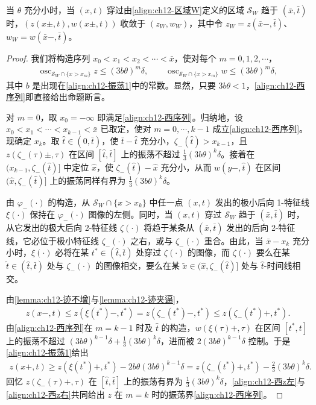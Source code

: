 \documentclass[../../main.tex]{subfiles}
\begin{document}
\begin{lemma}\label{lemma:ch12-西区域}
当 $\theta$ 充分小时，当 $(x,t)$ 穿过由\eqref{align:ch12-区域W}定义的区域 $\mathscr{S}_W$ 趋于 $(\bar x,\bar t)$ 时，$(z(x\pm,t),w(x\pm,t))$ 收敛于 $(z_W,w_W)$，其中令 $z_W=z(\bar x-,\bar t)$、$w_W=w(\bar x-,\bar t)$。
\end{lemma}

\begin{proof}
我们将构造序列 $x_0<x_1<x_2<\cdots<\bar x$，使对每个 $m=0,1,2,\cdots$，
\begin{align}
\operatorname{osc}_{\mathscr{S}_W\cap\{x>x_m\}}z\leqslant(3b\theta)^m\delta,\qquad
\operatorname{osc}_{\mathscr{S}_W\cap\{x>x_m\}}w\leqslant(3b\theta)^m\delta,
\label{align:ch12-西序列}
\end{align}
其中 $b$ 是出现在\eqref{align:ch12-振荡1}中的常数。显然，只要 $3b\theta<1$，\eqref{align:ch12-西序列}即直接给出命题断言。

对 $m=0$，取 $x_0=-\infty$ 即满足\eqref{align:ch12-西序列}。归纳地，设 $x_0<x_1<\cdots<x_{k-1}<\bar x$ 已取定，使对 $m=0,\cdots,k-1$ 成立\eqref{align:ch12-西序列}。现确定 $x_k$。取 $\hat t\in(0,\bar t)$，使 $\bar t-\hat t$ 充分小，$\zeta_-(\hat t)>x_{k-1}$，且 $z(\zeta_-(\tau)\pm,\tau)$ 在区间 $[\hat t,\bar t]$ 上的振荡不超过 $\frac13(3b\theta)^k\delta$。接着在 $(x_{k-1},\zeta_-(\hat t)]$ 中定位 $\hat x$，使 $\zeta_-(\hat t)-\hat x$ 充分小，从而 $w(y-,\hat t)$ 在区间 $(\hat x,\zeta_-(\hat t)]$ 上的振荡同样有界为 $\frac13(3b\theta)^k\delta$。

由 $\varphi_-(\cdot)$ 的构造，从 $\mathscr{S}_W\cap\{x>x_k\}$ 中任一点 $(x,t)$ 发出的极小后向 1-特征线 $\xi(\cdot)$ 保持在 $\varphi_-(\cdot)$ 图像的左侧。同时，当 $(x,t)$ 穿过 $\mathscr{S}_W$ 趋于 $(\bar x,\bar t)$ 时，从它发出的极大后向 2-特征线 $\zeta(\cdot)$ 将趋于某条从 $(\bar x,\bar t)$ 发出的后向 2-特征线，它必位于极小特征线 $\zeta_-(\cdot)$ 之右，或与 $\zeta_-(\cdot)$ 重合。由此，当 $\bar x-x_k$ 充分小时，$\xi(\cdot)$ 必将在某 $t^*\in(\hat t,\bar t)$ 处穿过 $\zeta(\cdot)$ 的图像，而 $\zeta(\cdot)$ 要么在某 $\tilde t\in(\hat t,\bar t)$ 处与 $\zeta_-(\cdot)$ 的图像相交，要么在某 $\tilde x\in(\hat x,\zeta_-(\hat t)]$ 处与 $\hat t$-时间线相交。

由\cref{lemma:ch12-迹不增}与\cref{lemma:ch12-迹夹逼}，
\begin{align}
z(x-,t)\leqslant z(\xi(t^*)-,t^*)=z(\zeta_-(t^*)-,t^*)\leqslant z(\zeta_-(t^*)+,t^*).
\label{align:ch12-西z左}
\end{align}
由\eqref{align:ch12-西序列}在 $m=k-1$ 时及 $\hat t$ 的构造，$w(\xi(\tau)+,\tau)$ 在区间 $[t^*,t]$ 上的振荡不超过 $(3b\theta)^{k-1}\delta+\frac13(3b\theta)^k\delta$，进而被 $2(3b\theta)^{k-1}\delta$ 控制。于是\eqref{align:ch12-振荡1}给出
\begin{align}
z(x+,t)\geqslant z(\xi(t^*)+,t^*)-2b\theta(3b\theta)^{k-1}\delta=z(\zeta_-(t^*)+,t^*)-\frac23(3b\theta)^k\delta.
\label{align:ch12-西z右}
\end{align}
回忆 $z(\zeta_-(\tau)+,\tau)$ 在 $[\hat t,\bar t]$ 上的振荡有界为 $\frac13(3b\theta)^k\delta$，\eqref{align:ch12-西z左}与\eqref{align:ch12-西z右}共同给出 $z$ 在 $m=k$ 时的振荡界\eqref{align:ch12-西序列}。


\end{proof}
\end{document}
